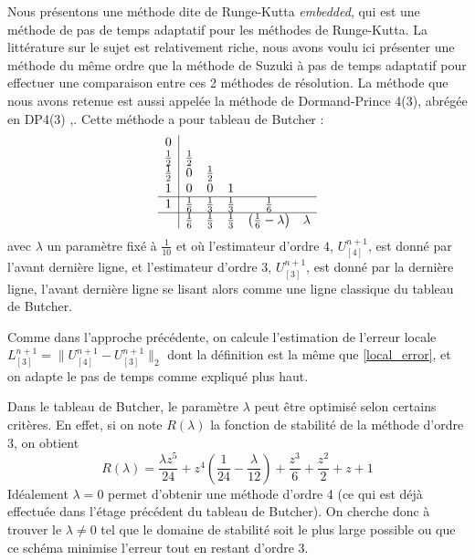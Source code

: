 Nous présentons une méthode dite de Runge-Kutta \emph{embedded}, qui est une méthode de pas de temps adaptatif pour les méthodes de Runge-Kutta. La littérature sur le sujet est relativement riche, nous avons voulu ici présenter une méthode du même ordre que la méthode de Suzuki à pas de temps adaptatif pour effectuer une comparaison entre ces 2 méthodes de résolution. La méthode que nous avons retenue est aussi appelée la méthode de Dormand-Prince 4(3), abrégée en DP4(3) \cite{Dormand:1978},\cite{Dormand:1980}. Cette méthode a pour tableau de Butcher :
$$
  \begin{array}{c|ccccc}
    0           & \\
    \frac{1}{2} & \frac{1}{2} \\
    \frac{1}{2} & 0           & \frac{1}{2} \\
    1           & 0           & 0           & 1           \\
  \hline
    1           & \frac{1}{6} & \frac{1}{3} & \frac{1}{3} & \frac{1}{6} \\
  \hline
                & \frac{1}{6} & \frac{1}{3} & \frac{1}{3} & \left(\frac{1}{6}-\lambda\right) & \lambda
  \end{array}
$$
avec $\lambda$ un paramètre fixé à $\frac{1}{10}$ et où l'estimateur d'ordre $4$, $U^{n+1}_{[4]}$, est donné par l'avant dernière ligne, et l'estimateur d'ordre $3$, $U^{n+1}_{[3]}$, est donné par la dernière ligne, l'avant dernière ligne se lisant alors comme une ligne classique du tableau de Butcher.

Comme dans l'approche précédente, on calcule l'estimation de l'erreur locale $L^{n+1}_{[3]} = \| U^{n+1}_{[4]}-U^{n+1}_{[3]} \|_2$ dont la définition est la même que \eqref{local_error}, et on adapte le pas de temps comme expliqué plus haut.  

Dans le tableau de Butcher, le paramètre $\lambda$ peut être optimisé selon certains critères. En effet, si on note $R(\lambda)$ la fonction de stabilité de la méthode d'ordre $3$, on obtient 
$$
R(\lambda)=  \frac{\lambda z^{5}}{24} + z^{4} \left(\frac{1}{24} - \frac{\lambda}{12}\right) + \frac{z^{3}}{6} + \frac{z^{2}}{2} + z + 1
$$
Idéalement $\lambda=0$ permet d'obtenir une méthode d'ordre 4 (ce qui est déjà effectuée dans l'étage précédent du tableau de Butcher). On cherche donc à trouver le $\lambda\neq 0$ tel que le domaine de stabilité soit le plus large possible ou que ce schéma minimise l'erreur tout en restant d'ordre 3. 
